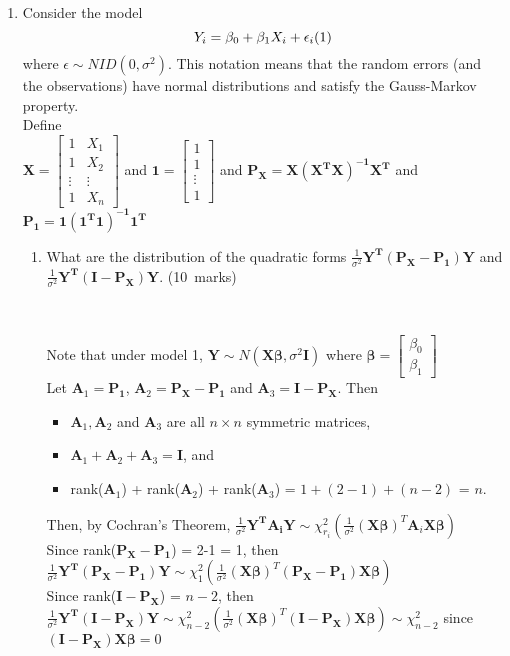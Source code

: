 \documentclass[soln,12pt]{utarexam}
\begin{document}
\begin{enumerate}
  
\item \label{NT-Q17}
Consider the model 
$$Y_i = \beta_0 + \beta_1X_i + \epsilon_i \hfill(1)$$
where $\epsilon \sim  NID(0, \sigma^2)$. This notation means that the random errors (and the
observations) have normal distributions and satisfy the Gauss-Markov property.\\
Define\\
$\mathbf{X} = \begin{bmatrix}1&X_1\\ 1&X_2 \\ \vdots&\vdots\\1&X_n\end{bmatrix}$ and $\mathbf{1} = \begin{bmatrix}1\\1\\ \vdots\\1\end{bmatrix}$ and $\mathbf{P_X} = \mathbf{X(X^TX)^{-1}X^T}$ and $\mathbf{P_1} = \mathbf{1(1^T1)^{-1}1^T}$ 
\begin{enumerate}
\item What are the distribution of the quadratic forms $\frac{1}{\sigma^2}\mathbf{Y^T(P_X-P_1)Y}$ and $\frac{1}{\sigma^2}\mathbf{Y^T(I-P_X)Y}$.
\hfill(10~marks)
\begin{answer}~

Note that under model 1, $\mathbf{Y} \sim N(\mathbf{X}\bm{\beta}, \sigma^2\mathbf{I})$ where $\bm{\beta} = \begin{bmatrix}\beta_0\\\beta_1\end{bmatrix}$\\
Let $\mathbf{A}_1 = \mathbf{P_1}$, $\mathbf{A}_2 = \mathbf{P_X-P_1}$ and $\mathbf{A}_3 = \mathbf{I-P_X}$. Then
\begin{itemize}
\item $\mathbf{A}_1, \mathbf{A}_2$ and $\mathbf{A}_3$ are all $n \times n$ symmetric matrices,
\item $\mathbf{A}_1 + \mathbf{A}_2 + \mathbf{A}_3 = \mathbf{I}$, and
\item rank($\mathbf{A}_1$) + rank($\mathbf{A}_2$) + rank($\mathbf{A}_3$) = $1 + (2-1) + (n-2)$ = $n$.
\end{itemize}
Then, by Cochran's Theorem, $\frac{1}{\sigma^2}\mathbf{Y^T\mathbf{A}_iY} \sim \chi^2_{r_i}(\frac{1}{\sigma^2}(\mathbf{X}\bm{\beta})^T\mathbf{A}_i\mathbf{X}\bm{\beta})$\\
Since rank($\mathbf{P_X-P_1}$) = 2-1 = 1, then \\
$\frac{1}{\sigma^2}\mathbf{Y^T(P_X-P_1)Y} \sim \chi^2_1(\frac{1}{\sigma^2}(\mathbf{X}\bm{\beta})^T(\mathbf{P_X-P_1})\mathbf{X}\bm{\beta})$\\
Since rank($\mathbf{I-P_X}$) = $n-2$, then \\
$\frac{1}{\sigma^2}\mathbf{Y^T(I-P_X)Y} \sim \chi^2_{n-2}(\frac{1}{\sigma^2}(\mathbf{X}\bm{\beta})^T(\mathbf{I-P_X})\mathbf{X}\bm{\beta}) \sim \chi_{n-2}^2$ since $(\mathbf{I-P_X})\mathbf{X}\bm{\beta}=0$\\
\end{answer}


\end{enumerate}
\end{enumerate}
\end{document}
